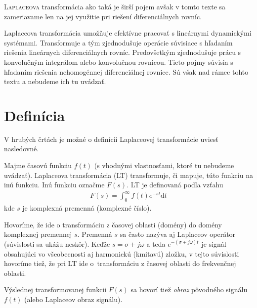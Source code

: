 \documentclass[a4paper, 10pt, ]{article}
\begin{document}
\bigskip

\normalsize
\normalfont












\noindent
\lettrine[lines=1, nindent=1pt, loversize=0.0]{L}{aplaceova} 
transformácia ako taká je širší pojem avšak v tomto texte sa zameriavame len na jej využitie pri riešení diferenciálnych rovníc.

Laplaceova transformácia umožňuje efektívne pracovať s lineárnymi dynamickými systémami. Transformuje a tým zjednodušuje operácie súvisiace s hľadaním riešenia lineárnych diferenciálnych rovníc. Predovšetkým zjednodušuje prácu s konvolučným integrálom alebo konvolučnou rovnicou. Tieto pojmy súvisia s hľadaním riešenia nehomogénnej diferenciálnej rovnice. Sú však nad rámec tohto textu a nebudeme ich tu uvádzať.


\section{Definícia}

V hrubých črtách je možné o definícii Laplaceovej transformácie uviesť nasledovné.

Majme časovú funkciu $f(t)$ (s vhodnými vlastnosťami, ktoré tu nebudeme uvádzať). Laplaceova transformácia (LT) transformuje, či mapuje, túto funkciu na inú funkciu. Inú funkciu označme $F(s)$. LT je definovaná podľa vzťahu
\begin{align}
    F(s) = \int_0^\infty f(t) e^{-st}\text{d}t
\end{align}
kde $s$ je komplexná premenná (komplexné číslo).


Hovoríme, že ide o transformáciu z časovej oblasti (domény) do domény komplexnej premennej $s$. Premenná $s$ sa často nazýva aj Laplaceov operátor (súvislosti sa ukážu neskôr). Keďže $s = \sigma + j\omega$ a teda $e^{-(\sigma + j\omega)t}$ je signál obsahujúci vo všeobecnosti aj harmonickú (kmitavú) zložku, v tejto súvislosti hovoríme tiež, že pri LT ide o~transformáciu z časovej oblasti do frekvenčnej oblasti.

Výslednej transformovanej funkcii $F(s)$ sa hovorí tiež \emph{obraz} pôvodného signálu $f(t)$ (alebo Laplaceov obraz signálu).
\end{document}
